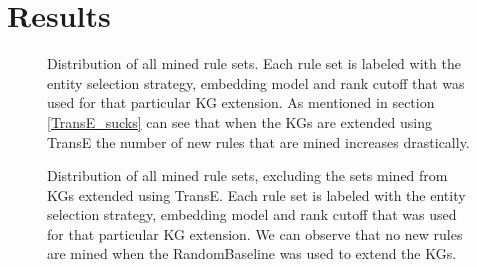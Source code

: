 \chapter{Results}
\begin{figure}[h]
\centering
    \centering
    
    \caption{Distribution of all mined rule sets. Each rule set is labeled with the entity selection strategy, embedding model and rank cutoff that was used for that particular KG extension. As mentioned in section \ref{TransE_sucks} can see that when the KGs are extended using TransE the number of new rules that are mined increases drastically.}
    \label{all_sets}
\end{figure}


\begin{figure}[h]
\centering
    \centering
    
    \caption{Distribution of all mined rule sets, excluding the sets mined from KGs extended using TransE. Each rule set is labeled with the entity selection strategy, embedding model and rank cutoff that was used for that particular KG extension. We can observe that no new rules are mined when the RandomBaseline was used to extend the KGs.}
    \label{all_sets_w_out_TransE}
\end{figure}

